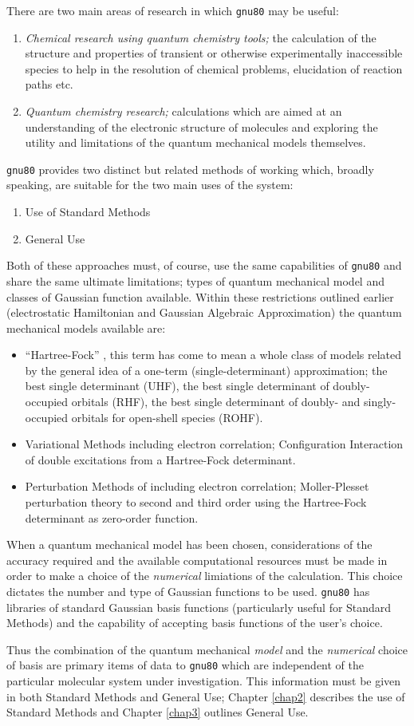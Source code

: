 There are two main areas of research in which {\tt gnu80} may be useful:
\begin{enumerate}
\item {\em Chemical research using quantum chemistry tools;}
the calculation of the structure and properties of transient or
otherwise experimentally inaccessible species to help in the
resolution of chemical problems, elucidation of reaction
paths etc.
\item {\em Quantum chemistry research;} calculations which are aimed at
an understanding of the electronic structure of molecules and
exploring the utility and limitations of the 
quantum mechanical models themselves.
\end{enumerate}
{\tt gnu80} provides two distinct but related methods of working
which, broadly speaking, are suitable for the two main uses of the system:
\begin{enumerate}
\item Use of Standard Methods
\item General Use
\end{enumerate}
Both of these approaches must, of course, use the same
capabilities of {\tt gnu80} and share the same ultimate limitations;
types of quantum mechanical model and classes of Gaussian function available.
Within these restrictions outlined earlier (electrostatic
Hamiltonian and Gaussian Algebraic Approximation) the quantum
mechanical models available are:
\begin{itemize}
\item ``Hartree-Fock'' , this term has come to mean a
whole class of models related by the general idea of a one-term
(single-determinant) approximation; the best single determinant (UHF),
the best single determinant of doubly-occupied orbitals (RHF),
the best single determinant of doubly- and singly-occupied orbitals
for open-shell species (ROHF). 
\item Variational Methods including electron correlation; 
Configuration Interaction  of double excitations from a Hartree-Fock
determinant.
\item Perturbation Methods of including electron correlation;
Moller-Plesset perturbation theory to second and third order using
the Hartree-Fock determinant as zero-order function.
\end{itemize}
When a quantum mechanical model has been chosen, considerations
of the accuracy required and the available computational resources
must be made in order to make a choice of the {\em numerical}
limiations of the calculation.
This choice dictates the number and type of Gaussian functions to be used.
{\tt gnu80} has libraries of standard Gaussian basis functions
(particularly useful for Standard Methods) and the capability
of accepting basis functions of the user's choice.

Thus the combination of the quantum mechanical {\em model}
and the {\em numerical} choice of basis are primary items of
data to {\tt gnu80} which are independent of the particular 
molecular system under investigation. This information must
be given in both Standard Methods and General Use; Chapter
\ref{chap2} describes the use of Standard Methods and
Chapter \ref{chap3} outlines General Use.
